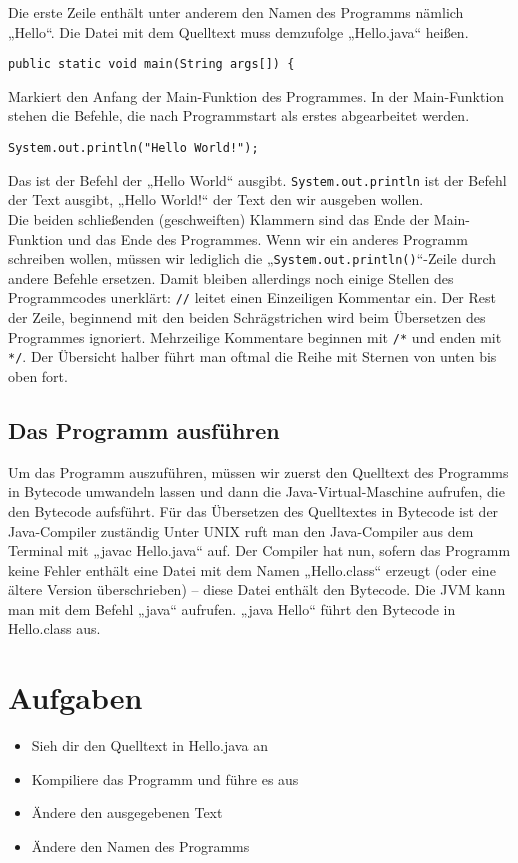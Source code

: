 Die erste Zeile enthält unter anderem den Namen des Programms nämlich „Hello“. Die Datei mit dem Quelltext muss demzufolge „Hello.java“ heißen. \\
\begin{lstlisting}
public static void main(String args[]) {
\end{lstlisting}
Markiert den Anfang der Main-Funktion des Programmes. In der Main-Funktion stehen die Befehle, die nach Programmstart als erstes abgearbeitet werden. \\
\begin{lstlisting}
System.out.println("Hello World!");
\end{lstlisting}
Das ist der Befehl der „Hello World“ ausgibt. \lstinline$System.out.println$ ist der Befehl der Text ausgibt, „Hello World!“ der Text den wir ausgeben wollen. \\
Die beiden schließenden (geschweiften) Klammern sind das Ende der Main-Funktion und das Ende des Programmes. 
Wenn wir ein anderes Programm schreiben wollen, müssen wir lediglich die „\lstinline$System.out.println()$“-Zeile durch andere Befehle ersetzen.
Damit bleiben allerdings noch einige Stellen des Programmcodes unerklärt: \lstinline$//$ leitet einen Einzeiligen Kommentar ein. Der Rest der Zeile, beginnend mit den beiden Schrägstrichen wird beim Übersetzen des Programmes ignoriert.
Mehrzeilige Kommentare beginnen mit \lstinline$/*$ und enden mit \lstinline$*/$. Der Übersicht halber führt man oftmal die Reihe mit Sternen von unten bis oben fort.


\subsection{Das Programm ausführen}
Um das Programm auszuführen, müssen wir zuerst den Quelltext des Programms in Bytecode umwandeln lassen und dann die Java-Virtual-Maschine aufrufen, die den Bytecode aufsführt. 
Für das Übersetzen des Quelltextes in Bytecode ist der Java-Compiler zuständig
Unter UNIX ruft man den Java-Compiler aus dem Terminal mit „javac Hello.java“ auf. Der Compiler hat nun, sofern das Programm keine Fehler enthält eine Datei mit dem Namen „Hello.class“ erzeugt (oder eine ältere Version überschrieben) – diese Datei enthält den Bytecode.
Die JVM kann man mit dem Befehl „java“ aufrufen. „java Hello“ führt den Bytecode in Hello.class aus.

\section {Aufgaben}
\begin{itemize}
\item Sieh dir den Quelltext in Hello.java an
\item Kompiliere das Programm und führe es aus
\item Ändere den ausgegebenen Text
\item Ändere den Namen des Programms
\end{itemize}

